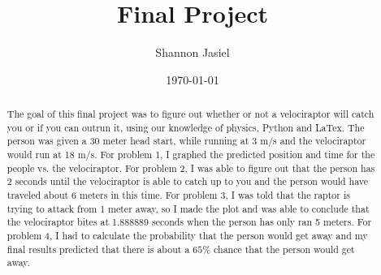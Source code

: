 \documentclass[twocolumn]{revtex4}
\begin{document}
\title{
Final Project
}

\author{Shannon Jasiel}

\date{\today}

\begin{abstract}
   The goal of this final project was to figure out whether or not a velociraptor will catch you or if you can outrun it, using our knowledge of physics, Python and LaTex. The person was given a 30 meter head start, while running at 3 m/s and the velociraptor would run at 18 m/s. For problem 1, I graphed the predicted position and time for the people vs. the velociraptor. For problem 2, I was able to figure out that the person has 2 seconds until the velociraptor is able to catch up to you and the person would have traveled about 6 meters in this time. For problem 3, I was told that the raptor is trying to attack from 1 meter away, so I made the plot and was able to conclude that the velociraptor bites at 1.888889 seconds when the person has only ran 5 meters. For problem 4, I had to calculate the probability that the person would get away and my final results predicted that there is about a $65\%$ chance that the person would get away.
\end{abstract}


\maketitle

\end{document}
